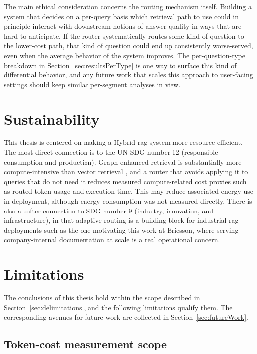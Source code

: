 \documentclass[english, bibtex]{kththesis}               %
\numberwithin{listing}{chapter}
\begin{document}
The main ethical consideration concerns the routing mechanism itself. Building a system that decides on a per-query basis which retrieval path to use could in principle interact with downstream notions of answer quality in ways that are hard to anticipate. If the router systematically routes some kind of question to the lower-cost path, that kind of question could end up consistently worse-served, even when the average behavior of the system improves. The per-question-type breakdown in Section~\ref{sec:resultsPerType} is one way to surface this kind of differential behavior, and any future work that scales this approach to user-facing settings should keep similar per-segment analyses in view.

\section{Sustainability}
\label{sec:discSustainability}

This thesis is centered on making a Hybrid \gls{rag} system more resource-efficient. The most direct connection is to the \gls{UN} \gls{SDG} number 12 (responsible consumption and production). Graph-enhanced retrieval is substantially more compute-intensive than vector retrieval \cite{lightrag2024,microsoft2024graphragcosts}, and a router that avoids applying it to queries that do not need it reduces measured compute-related cost proxies such as routed token usage and execution time. This may reduce associated energy use in deployment, although energy consumption was not measured directly. There is also a softer connection to \gls{SDG} number 9 (industry, innovation, and infrastructure), in that adaptive routing is a building block for industrial \gls{rag} deployments such as the one motivating this work at Ericsson, where serving company-internal documentation at scale is a real operational concern.

\section{Limitations}
\label{sec:discLimitations}

The conclusions of this thesis hold within the scope described in Section~\ref{sec:delimitations}, and the following limitations qualify them. The corresponding avenues for future work are collected in Section~\ref{sec:futureWork}.

\subsection{Token-cost measurement scope}
\label{sec:limitTokenCost}
\end{document}
